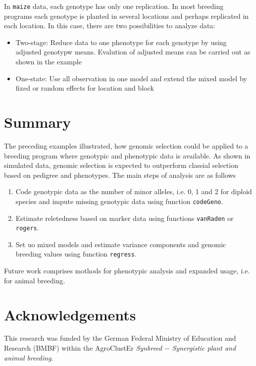 \documentclass[a4paper,11pt]{article}
\begin{document}
In \texttt{maize} data, each genotype has only one replication. In most breeding programs each genotype is planted in several locations and perhaps replicated in each location. In this case, there are two possibilities to analyze data: 
\begin{itemize}
\item Two-stage: Reduce data to one phenotype for each genotype by using adjusted genotypw means. Evalution of adjusted means can be carried out as shown in the example                                                                    
\item One-state: Use all observation in one model and extend the mixed model by fixed or random effects for location and block
\end{itemize}                                                                                                                                           

\section{Summary}

The preceding examples illustrated, how genomic selection could be applied to a breeding program where genotypic and phenotypic data is available. As shown in simulated data, genomic selection is expected to outperform classial selection based on pedigree and phenotypes. The main steps of analysis are as follows
\begin{enumerate}
\item Code genotypic data as the number of minor alleles, i.e. 0, 1 and 2 for diploid species and impute missing genotypic data using function \texttt{codeGeno}.
\item Estimate reletedness based on marker data using functions \texttt{vanRaden} or \texttt{rogers}.
\item Set uo mixed models and estimate variance components and genomic breeding values using function \texttt{regress}. 
\end{enumerate}
Future work comprises mothods for phenotypic analysis and expanded usage, i.e. for animal breeding.
                                        
                                                                                                                                                      

 


\section{Acknowledgements}

This research was funded by the German Federal Ministry of Education and                                                                                    
Research (BMBF) within the AgroClustEr \textit{Synbreed} $-$  \textit{Synergistic plant and
animal breeding}.

  
\end{document}
